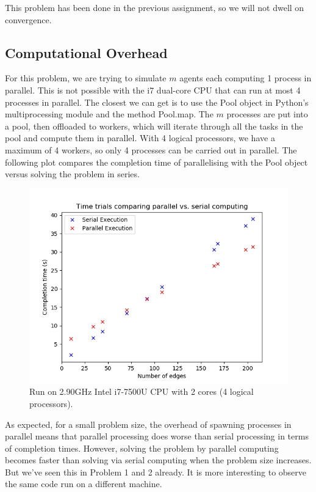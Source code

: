 \documentclass[12pt]{article}
\begin{document}
This problem has been done in the previous assignment, so we will not dwell on convergence.

\subsection*{Computational Overhead}

For this problem, we are trying to simulate $m$ agents each computing 1 process in parallel. This is not possible with the i7 dual-core CPU that can run at most 4 processes in parallel. The closest we can get is to use the Pool object in Python's multiprocessing module and the method Pool.map. The $m$ processes are put into a pool, then offloaded to workers, which will iterate through all the tasks in the pool and compute them in parallel. With 4 logical processors, we have a maximum of 4 workers, so only 4 processes can be carried out in parallel. The following plot compares the completion time of parallelising with the Pool object versus solving the problem in series.

\begin{figure}[H]
	\includegraphics[scale=1]{Problem3-TimeTrial.png}
	\caption{Run on 2.90GHz Intel i7-7500U CPU with 2 cores (4 logical processors).}
\end{figure}

As expected, for a small problem size, the overhead of spawning processes in parallel means that parallel processing does worse than serial processing in terms of completion times. However, solving the problem by parallel computing becomes faster than solving via serial computing when the problem size increases. But we've seen this in Problem 1 and 2 already. It is more interesting to observe the same code run on a different machine.
\end{document}
